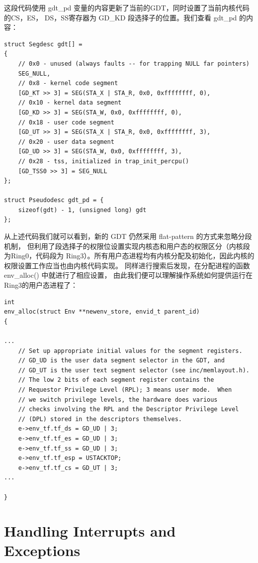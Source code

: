 \documentclass[12pt, letterpaper]{report}
\begin{document}
\setmainfont{Times New Roman}
这段代码使用 gdt\_pd 变量的内容更新了当前的GDT，同时设置了当前内核代码的CS，ES，
DS，SS寄存器为 GD\_KD 段选择子的位置。我们查看 gdt\_pd 的内容：\par
\lstset{style=CStyle}
\setmainfont{Consolas}
\begin{lstlisting}
struct Segdesc gdt[] =
{
    // 0x0 - unused (always faults -- for trapping NULL far pointers)
    SEG_NULL,
    // 0x8 - kernel code segment
    [GD_KT >> 3] = SEG(STA_X | STA_R, 0x0, 0xffffffff, 0),
    // 0x10 - kernel data segment
    [GD_KD >> 3] = SEG(STA_W, 0x0, 0xffffffff, 0),
    // 0x18 - user code segment
    [GD_UT >> 3] = SEG(STA_X | STA_R, 0x0, 0xffffffff, 3),
    // 0x20 - user data segment
    [GD_UD >> 3] = SEG(STA_W, 0x0, 0xffffffff, 3),
    // 0x28 - tss, initialized in trap_init_percpu()
    [GD_TSS0 >> 3] = SEG_NULL
};

struct Pseudodesc gdt_pd = {
    sizeof(gdt) - 1, (unsigned long) gdt
};
\end{lstlisting}
\setmainfont{Times New Roman}
\newpage 
从上述代码我们就可以看到，新的 GDT 仍然采用 flat-pattern 的方式来忽略分段机制，
但利用了段选择子的权限位设置实现内核态和用户态的权限区分（内核段为Ring0，代码段为
Ring3）。所有用户态进程均有内核分配及初始化，因此内核的权限设置工作应当也由内核代码实现。
同样进行搜索后发现，在分配进程的函数 env\_alloc() 中就进行了相应设置，
由此我们便可以理解操作系统如何提供运行在Ring3的用户态进程了：\par 
\quad \par 
\lstset{style=CStyle}
\setmainfont{Consolas}
\begin{lstlisting}
int
env_alloc(struct Env **newenv_store, envid_t parent_id)
{

...
    // Set up appropriate initial values for the segment registers.
	// GD_UD is the user data segment selector in the GDT, and
	// GD_UT is the user text segment selector (see inc/memlayout.h).
	// The low 2 bits of each segment register contains the
	// Requestor Privilege Level (RPL); 3 means user mode.  When
	// we switch privilege levels, the hardware does various
	// checks involving the RPL and the Descriptor Privilege Level
	// (DPL) stored in the descriptors themselves.
	e->env_tf.tf_ds = GD_UD | 3;
	e->env_tf.tf_es = GD_UD | 3;
	e->env_tf.tf_ss = GD_UD | 3;
	e->env_tf.tf_esp = USTACKTOP;
	e->env_tf.tf_cs = GD_UT | 3;
...

}
\end{lstlisting}
\setmainfont{Times New Roman}


\newpage
\section[\large Handling Interrupts and Exceptions]{Handling Interrupts and Exceptions}
\end{document}
